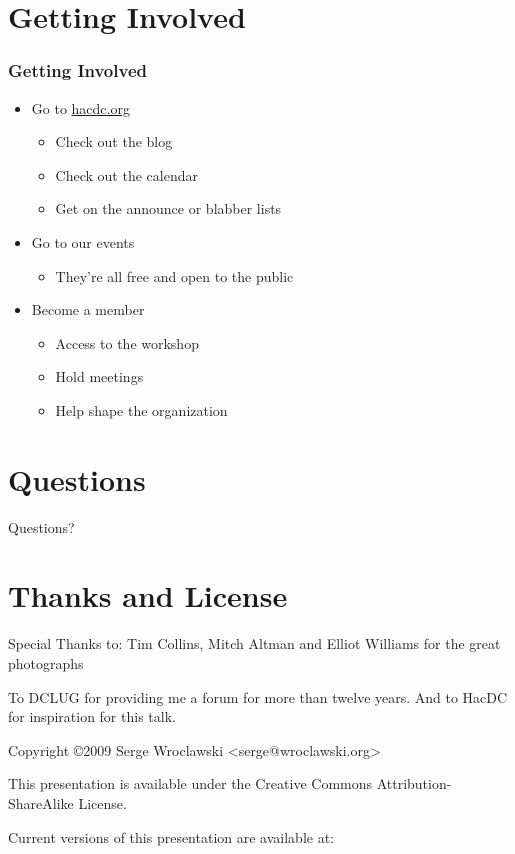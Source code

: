 \documentclass[notes]{beamer}
\begin{document}
\section{Getting Involved}

\begin{frame}
  \frametitle{Getting Involved}
  \begin{itemize}
  \item Go to \href{http://hacdc.org}{hacdc.org}
    \begin{itemize}
    \item Check out the blog
    \item Check out the calendar
    \item Get on the announce or blabber lists
    \end{itemize}
  \item Go to our events
    \begin{itemize}
    \item They're all free and open to the public
    \end{itemize}
  \item Become a member
    \begin{itemize}
    \item Access to the workshop
    \item Hold meetings
    \item Help shape the organization
    \end{itemize}
  \end{itemize}
\end{frame}

\section{Questions}

\begin{frame}
  \begin{center}
    {\Large Questions?}
  \end{center}
\end{frame}

\section{Thanks and License}

\begin{frame}
  Special Thanks to:
  Tim Collins, Mitch Altman and Elliot Williams for the great photographs
  
  To DCLUG for providing me a forum for more than twelve years.
  And to HacDC for inspiration for this talk.
  
  Copyright \copyright 2009 Serge Wroclawski <serge@wroclawski.org>
  
  This presentation is available under the Creative Commons
  Attribution-ShareAlike License.
  
  Current versions of this presentation are available at:
  
\end{frame}
\end{document}
